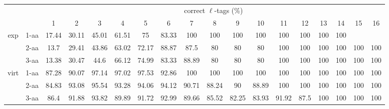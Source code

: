 \documentclass{article}[12pt]
\begin{document}
\begin{landscape}
\begin{table}[h]\tiny
\vspace{3mm}
{\centering
\begin{center}
\begin{tabular}{|c|l|c|c|c|c|c|c|c|c|c|c|c|c|c|c|c|c|}
  \hline
  \multicolumn{2}{|c|}{ } & \multicolumn{ 16 }{|c|}{ correct $\ell$-tags (\%)} \\
  \cline{3- 18}
  \multicolumn{2}{|c|}{ }  & 1 & 2 & 3 & 4 & 5 & 6 & 7 & 8 & 9 & 10 & 11 & 12 & 13 & 14 & 15 & 16\\
  \hline
  \multirow{3}{*}{exp}
&  1-aa  & 17.44 & 30.11 & 45.01 & 61.51 & 75 & 83.33 & 100 & 100 & 100 & 100 & 100 & 100 & 100 & 100 &  & \\
&  2-aa  & 13.7 & 29.41 & 43.86 & 63.02 & 72.17 & 88.87 & 87.5 & 80 & 80 & 80 & 100 & 100 & 100 & 100 & 100 & 100\\
&  3-aa  & 13.38 & 30.47 & 44.6 & 66.12 & 74.99 & 83.33 & 88.89 & 80 & 80 & 80 & 100 & 100 & 100 & 100 & 100 & 100\\
 \hline
  \multirow{3}{*}{virt} 
&  1-aa  & 87.28 & 90.07 & 97.14 & 97.02 & 97.53 & 92.86 & 100 & 100 & 100 & 100 & 100 & 100 & 100 & 100 & 100 & 100\\
&  2-aa  & 84.83 & 93.08 & 95.54 & 93.28 & 94.06 & 94.12 & 90.71 & 88.24 & 90 & 88.89 & 100 & 100 & 100 & 100 & 100 & 100\\
&  3-aa  & 86.4 & 91.88 & 93.82 & 89.89 & 91.72 & 92.99 & 89.66 & 85.52 & 82.25 & 83.93 & 91.92 & 87.5 & 100 & 100 & 100 & 100\\
 \hline
\end{tabular}
\end{center}
\par}
\centering
\vspace{3mm}
\end{table}


\end{landscape}
\end{document}
